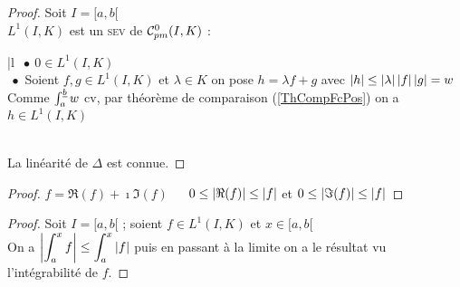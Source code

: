 	
	\begin{proof} Soit $I=[a,b[$ \vspace*{0.2cm}\\
		$L^1(I,K)$ est un \textsc{sev} de ${\mathcal{C}_{pm}^0}(I,K)$ : \\ 
		\hspace*{0.5cm}\begin{blockarray}{|l}
			$~\bullet ~0\in L^1(I,K)$ \\ 
			$~\bullet$ Soient $f,g\in L^1(I,K)$ et $\lambda\in K$ on pose $h=\lambda f+g$ avec $\left\vert h \right\vert\leq \left\vert \lambda \right\vert\left\vert f \right\vert\left\vert g \right\vert = w$ \\ 
			Comme $\int_a^{\uline{b}} w$ cv, par théorème de comparaison (\ref{ThCompFcPos}) on a $h\in L^1(I,K)$  
		\end{blockarray} \vspace*{0.2cm}\\
		La linéarité de $\Delta$ est connue.
	\end{proof} \medskip
	
	
	\begin{proof}
		\fbox{$\Leftarrow$} $f=\Re(f)+\imath \Im(f)$ $~~~~$ \fbox{$\Rightarrow$} $0\leq\left\vert \Re(f) \right\vert \leq \left\vert f \right\vert$ et $0\leq\left\vert \Im(f) \right\vert\leq\left\vert f \right\vert$
	\end{proof} \medskip
	
	
	
	\begin{proof}
		Soit $I=[a,b[$ ; soient $f\in L^1(I,K)$ et $x\in [a,b[$\\
		On a $\displaystyle{\left\vert \int_a^x f \right\vert \leq \int_a^x \left\vert f \right\vert}$ puis en passant à la limite on a le résultat vu l'intégrabilité de $f$.
	\end{proof} \medskip
	
	
